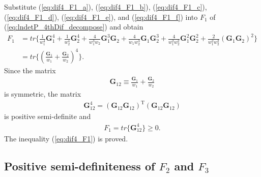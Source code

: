 \documentclass[12pt]{article}
\begin{document}
Substitute (\ref{eq:dif4_F1_a}), (\ref{eq:dif4_F1_b}), (\ref{eq:dif4_F1_c}), (\ref{eq:dif4_F1_d}), (\ref{eq:dif4_F1_e}), and (\ref{eq:dif4_F1_f}) into $F_1$ of (\ref{eq:lndetP_4thDif_decompose}) and obtain
\begin{align*}
F_1 &= tr\{ \frac{1}{w_1^4} \mathbf{G}_1^4 + \frac{1}{w_2^4} \mathbf{G}_2^4 + \frac{4}{w_1^3 w_2} \mathbf{G}_1^3 \mathbf{G}_2 + \frac{4}{w_1 w_2^3} \mathbf{G}_1 \mathbf{G}_2^3 + \frac{4}{w_1^2 w_2^2} \mathbf{G}_1^2 \mathbf{G}_2^2 + \frac{2}{w_1^2 w_2^2} (\mathbf{G}_1 \mathbf{G}_2)^2 \}   \\
  &= tr\{ (\frac{\mathbf{G}_1}{w_1} + \frac{\mathbf{G}_2}{w_2})^4 \}.
\end{align*}
Since the matrix
\begin{align*}
\mathbf{G}_{12} \equiv \frac{\mathbf{G}_1}{w_1} + \frac{\mathbf{G}_2}{w_2}
\end{align*}
is symmetric, the matrix
\begin{align*}
\mathbf{G}_{12}^4 = (\mathbf{G}_{12} \mathbf{G}_{12})^{\mathrm{T}} (\mathbf{G}_{12} \mathbf{G}_{12})
\end{align*}
is positive semi-definite and
\begin{align*}
F_1 = tr\{ \mathbf{G}_{12}^4 \} \geq 0.
\end{align*}
The inequality (\ref{eq:dif4_F1}) is proved.

\subsection{Positive semi-definiteness of $F_2$ and $F_3$}  \label{app:dif4_F2+F3}
\end{document}
